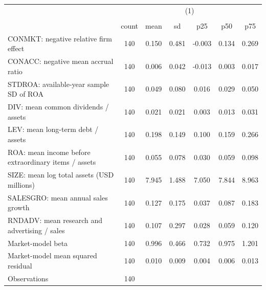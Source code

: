 {
\def\sym#1{\ifmmode^{#1}\else\(^{#1}\)\fi}
\begin{tabular}{l*{1}{cccccc}}
\hline\hline
                    &\multicolumn{6}{c}{(1)}                                                      \\
                    &\multicolumn{6}{c}{}                                                         \\
                    &       count&        mean&          sd&         p25&         p50&         p75\\
\hline
CONMKT: negative relative firm effect&         140&       0.150&       0.481&      -0.003&       0.134&       0.269\\
CONACC: negative mean accrual ratio&         140&       0.006&       0.042&      -0.013&       0.003&       0.017\\
STDROA: available-year sample SD of ROA&         140&       0.049&       0.080&       0.016&       0.029&       0.050\\
DIV: mean common dividends / assets&         140&       0.021&       0.021&       0.003&       0.013&       0.031\\
LEV: mean long-term debt / assets&         140&       0.198&       0.149&       0.100&       0.159&       0.266\\
ROA: mean income before extraordinary items / assets&         140&       0.055&       0.078&       0.030&       0.059&       0.098\\
SIZE: mean log total assets (USD millions)&         140&       7.945&       1.488&       7.050&       7.844&       8.963\\
SALESGRO: mean annual sales growth&         140&       0.127&       0.175&       0.037&       0.087&       0.183\\
RNDADV: mean research and advertising / sales&         140&       0.107&       0.297&       0.028&       0.059&       0.120\\
Market-model beta   &         140&       0.996&       0.466&       0.732&       0.975&       1.201\\
Market-model mean squared residual&         140&       0.010&       0.009&       0.004&       0.006&       0.013\\
\hline
Observations        &         140&            &            &            &            &            \\
\hline\hline
\end{tabular}
}
